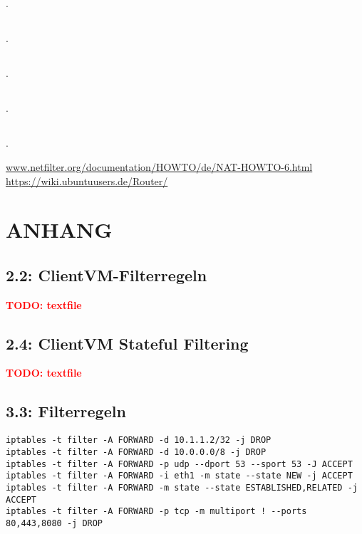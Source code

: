 \documentclass[twoside]{article}
\newcommand{\todo}[1]{\textcolor{red}{\begin{Huge}
	\begin{center}
		\textbf{TODO: #1}
	\end{center}
\end{Huge}}}
\begin{document}
	\subsection{}.
	\label{ssec:6.2}
	\subsection{}.
	\label{ssec:6.3}
	\subsection{}.
	\label{ssec:6.4}
	\subsection{}.
	\label{ssec:6.5}
	\subsection{}.
	\label{ssec:6.6}


\begin{thebibliography}{1}
			\url{www.netfilter.org/documentation/HOWTO/de/NAT-HOWTO-6.html}
	\url{https://wiki.ubuntuusers.de/Router/}
\end{thebibliography}
\newpage
\section*{ANHANG}
\label{sec:app}
	\subsection*{2.2: ClientVM-Filterregeln}
	\label{2.2-1}
	\todo{textfile}
	\subsection*{2.4: ClientVM Stateful Filtering}
	\label{2.4-1}
	\todo{textfile}
	\subsection*{3.3: Filterregeln}
	\label{3.3-1}
	\begin{lstlisting}
iptables -t filter -A FORWARD -d 10.1.1.2/32 -j DROP
iptables -t filter -A FORWARD -d 10.0.0.0/8 -j DROP
iptables -t filter -A FORWARD -p udp --dport 53 --sport 53 -J ACCEPT
iptables -t filter -A FORWARD -i eth1 -m state --state NEW -j ACCEPT
iptables -t filter -A FORWARD -m state --state ESTABLISHED,RELATED -j ACCEPT
iptables -t filter -A FORWARD -p tcp -m multiport ! --ports 80,443,8080 -j DROP
	\end{lstlisting}
\end{document}
